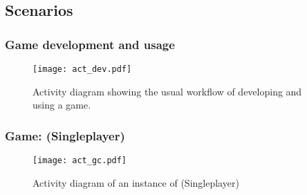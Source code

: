 \subsection{Scenarios}

\subsubsection{Game development and usage}
\begin{figure}[h!]
	\centering
	\texttt{[image: act\_dev.pdf]}
	\caption{Activity diagram showing the usual workflow of developing and using a game.}
	\label{img:ACTDEV}
\end{figure}
\pagebreak
\subsubsection{Game: \graphcoloring (Singleplayer)}
\begin{figure}[h!]
	\centering
	\texttt{[image: act\_gc.pdf]}
	\caption{Activity diagram of an instance of \graphcoloring (Singleplayer)}
	\label{img:ACTGC}
\end{figure}